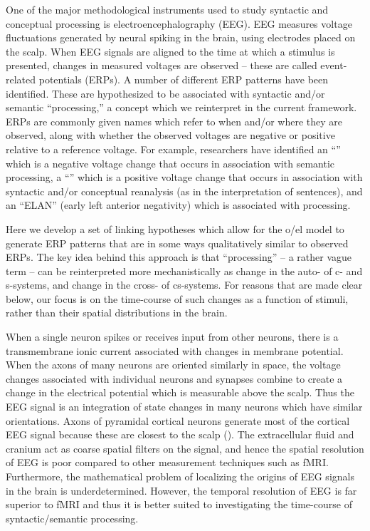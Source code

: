 One of the major methodological instruments used to study syntactic and conceptual processing is electroencephalography (EEG). EEG measures voltage fluctuations generated by neural spiking in the brain, using electrodes placed on the scalp. When EEG signals are aligned to the time at which a stimulus is presented, changes in measured voltages are observed -- these are called event-related potentials (ERPs). A number of different ERP patterns have been identified. These are hypothesized to be associated with syntactic and/or semantic “processing,” a concept which we reinterpret in the current framework. ERPs are commonly given names which refer to when and/or where they are observed, along with whether the observed voltages are negative or positive relative to a reference voltage. For example, researchers have identified an “” which is a negative voltage change that occurs in association with semantic processing, a “” which is a positive voltage change that occurs in association with syntactic and/or conceptual reanalysis (as in the interpretation of  sentences), and an “ELAN” (early left anterior negativity) which is associated with  processing. 

Here we develop a set of linking hypotheses which allow for the o/el model to generate ERP patterns that are in some ways qualitatively similar to observed ERPs. The key idea behind this approach is that “processing” -- a rather vague term -- can be reinterpreted more mechanistically as change in the auto- of c- and s-systems, and change in the cross- of cs-systems. For reasons that are made clear below, our focus is on the time-course of such changes as a function of stimuli, rather than their spatial distributions in the brain.

When a single neuron spikes or receives input from other neurons, there is a transmembrane ionic current associated with changes in membrane potential. When the axons of many neurons are oriented similarly in space, the voltage changes associated with individual neurons and synapses combine to create a change in the electrical potential which is measurable above the scalp. Thus the EEG signal is an integration of state changes in many neurons which have similar orientations. Axons of pyramidal cortical neurons generate most of the cortical EEG signal because these are closest to the scalp (\citealt{FedermeierLaszlo2009,KutasDale1997}). The extracellular fluid and cranium act as coarse spatial filters on the signal, and hence the spatial resolution of EEG is poor compared to other measurement techniques such as fMRI. Furthermore, the mathematical problem of localizing the origins of EEG signals in the brain is underdetermined. However, the temporal resolution of EEG is far superior to fMRI and thus it is better suited to investigating the time-course of syntactic/semantic processing. 

